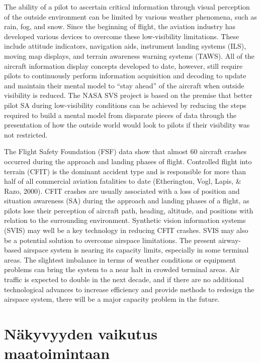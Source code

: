 \documentclass[utf8,bachelor,manualbib]{gradu3}
\begin{document}
The ability of a pilot to ascertain critical information through visual perception
of the outside environment can be limited by various weather phenomena, such as
rain, fog, and snow. Since the beginning of flight, the aviation industry has developed
various devices to overcome these low-visibility limitations. These include
attitude indicators, navigation aids, instrument landing systems (ILS), moving
map displays, and terrain awareness warning systems (TAWS). All of the aircraft
information display concepts developed to date, however, still require pilots to
continuously perform information acquisition and decoding to update and maintain
their mental model to “stay ahead” of the aircraft when outside visibility is reduced.
The NASA SVS project is based on the premise that better pilot SA during
low-visibility conditions can be achieved by reducing the steps required to build a
mental model from disparate pieces of data through the presentation of how the
outside world would look to pilots if their visibility was not restricted. \citep{prinzel2004}

The Flight Safety Foundation (FSF) data show that almost 60%
aircraft crashes occurred during the approach and landing phases of flight. Controlled
flight into terrain (CFIT) is the dominant accident type and is responsible
for more than half of all commercial aviation fatalities to date (Etherington, Vogl,
Lapis, \& Razo, 2000). CFIT crashes are usually associated with a loss of position
and situation awareness (SA) during the approach and landing phases of a flight, as
pilots lose their perception of aircraft path, heading, altitude, and positions with relation
to the surrounding environment. Synthetic vision information systems
(SVIS) may well be a key technology in reducing CFIT crashes. SVIS may also be
a potential solution to overcome airspace limitations. The present airway-based
airspace system is nearing its capacity limits, especially in some terminal areas.
The slightest imbalance in terms of weather conditions or equipment problems can
bring the system to a near halt in crowded terminal areas. Air traffic is expected to
double in the next decade, and if there are no additional technological advances to
increase efficiency and provide methods to redesign the airspace system, there will
be a major capacity problem in the future. \citep{schnell2004}

\section{Näkyvyyden vaikutus maatoimintaan}
\end{document}
